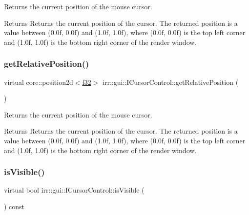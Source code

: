 Returns the current position of the mouse cursor. 

\begin{DoxyReturn}{Returns}
Returns the current position of the cursor. The returned position is a value between (0.\+0f, 0.\+0f) and (1.\+0f, 1.\+0f), where (0.\+0f, 0.\+0f) is the top left corner and (1.\+0f, 1.\+0f) is the bottom right corner of the render window. 
\end{DoxyReturn}
\mbox{\label{classirr_1_1gui_1_1ICursorControl_a8ba1cb0ff11edc5fb32cdadddece09f8}} 
\subsubsection{\texorpdfstring{get\+Relative\+Position()}{getRelativePosition()}\hspace{0.1cm}{\footnotesize\ttfamily [2/2]}}
{\footnotesize\ttfamily virtual core\+::position2d$<$\hyperlink{namespaceirr_a0277be98d67dc26ff93b1a6a1d086b07}{f32}$>$ irr\+::gui\+::\+I\+Cursor\+Control\+::get\+Relative\+Position (\begin{DoxyParamCaption}{ }\end{DoxyParamCaption})\hspace{0.3cm}{\ttfamily [pure virtual]}}



Returns the current position of the mouse cursor. 

\begin{DoxyReturn}{Returns}
Returns the current position of the cursor. The returned position is a value between (0.\+0f, 0.\+0f) and (1.\+0f, 1.\+0f), where (0.\+0f, 0.\+0f) is the top left corner and (1.\+0f, 1.\+0f) is the bottom right corner of the render window. 
\end{DoxyReturn}
\mbox{\label{classirr_1_1gui_1_1ICursorControl_ae1d1ca4c1c3042388881fabda4e53a42}} 
\subsubsection{\texorpdfstring{is\+Visible()}{isVisible()}\hspace{0.1cm}{\footnotesize\ttfamily [1/2]}}
{\footnotesize\ttfamily virtual bool irr\+::gui\+::\+I\+Cursor\+Control\+::is\+Visible (\begin{DoxyParamCaption}{ }\end{DoxyParamCaption}) const\hspace{0.3cm}{\ttfamily [pure virtual]}}



